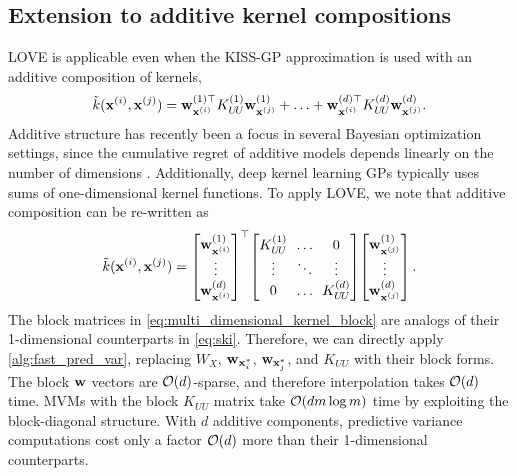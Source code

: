 

\subsection{Extension to additive kernel compositions}
LOVE{} is applicable even when the KISS-GP approximation is used with an additive composition of kernels,
%
\begin{equation}
  \tilde{k}(\mathbf{x}^{(i)}, \mathbf{x}^{(j)}) =
  \mathbf{w}^{(1)\top}_{\mathbf{x}^{(i)}} K^{(1)}_{U \! U} \mathbf{w}^{(1)}_{\mathbf{x}^{(j)}} + \ldots + \mathbf{w}^{(d)\top}_{\mathbf{x}^{(i)}} K^{(d)}_{U \! U} \mathbf{w}^{(d)}_{\mathbf{x}^{(j)}}.
  \notag
\end{equation}
Additive structure has recently been a focus in several Bayesian optimization settings, since the cumulative regret of additive models depends linearly on the number of dimensions
\cite{kandasamy2015high,wang2017batched,gardner2017discovering,wang2017max}.
Additionally, deep kernel learning GPs \citep{wilson2016stochastic,wilson2016deep} typically uses sums of one-dimensional kernel functions.
To apply LOVE{}, we note that additive composition can be re-written as
%
\begin{equation}
  \tilde{k}(\bx^{(i)}, \bx^{(j)}) =
  \begin{bmatrix}
    \bw^{(1)}_{\bx^{(i)}} \\
    \vdots \\
    \bw^{(d)}_{\bx^{(i)}}
  \end{bmatrix}^\top
  \!
  \begin{bmatrix}
    K^{(1)}_{U \! U} & \!\! \ldots \!\! & 0 \\
    \vdots & \!\! \ddots \!\! & \vdots \\
    0 & \!\! \ldots \!\! & K^{(d)}_{U \! U}
  \end{bmatrix}
  \!
  \begin{bmatrix}
    \bw^{(1)}_{\bx^{(j)}} \\
    \vdots \\
    \bw^{(d)}_{\bx^{(j)}}
  \end{bmatrix}.
  \label{eq:multi_dimensional_kernel_block}
\end{equation}
%
The block matrices in \eqref{eq:multi_dimensional_kernel_block} are analogs of their 1-dimensional counterparts in \eqref{eq:ski}.
Therefore, we can directly apply \autoref{alg:fast_pred_var}, replacing $W_X$, $\mathbf{w}_{\mathbf{x}^*_i}$, $\mathbf{w}_{\mathbf{x}^*_j}$, and $K_{UU}$ with their block forms.
The block $\mathbf{w}$ vectors are $\bigo{d}$-sparse, and therefore interpolation takes $\bigo{d}$ time.
MVMs with the block $K_{UU}$ matrix take $\bigo{dm\log m}$ time by exploiting the block-diagonal structure. With $d$ additive components, predictive variance computations cost only a factor $\bigo{d}$ more than their 1-dimensional counterparts.
